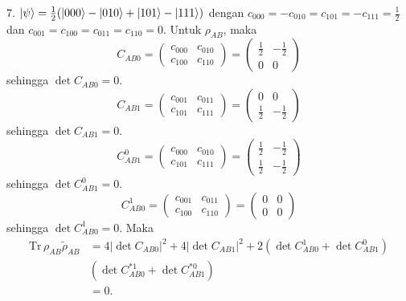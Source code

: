7. { $\ket{\psi}=\frac{1}{2}(\ket{000}-\ket{010}+\ket{101}-\ket{111})$}
dengan $c_{000}=-c_{010}=c_{101}=-c_{111}=\frac{1}{2}$ dan $c_{001}=c_{100}=c_{011}=c_{110}=0$.
Untuk $\rho_{AB}$, maka
\begin{equation}
	C_{AB0}=
	\begin{pmatrix}
		c_{000} & c_{010} \\
		c_{100} & c_{110}
	\end{pmatrix}=
	\begin{pmatrix}
		\frac{1}{2} & -\frac{1}{2} \\
		0 & 0
	\end{pmatrix}
\end{equation}
sehingga $\det C_{AB0} = 0$.
\begin{equation}
	C_{AB1}=
	\begin{pmatrix}
		c_{001} & c_{011} \\
		c_{101} & c_{111}
	\end{pmatrix}=
	\begin{pmatrix}
		0 & 0 \\
		\frac{1}{2} & -\frac{1}{2}
	\end{pmatrix}
\end{equation}
sehingga $\det C_{AB1} = 0$.
\begin{equation}
	C_{AB1}^0=
	\begin{pmatrix}
		c_{000} & c_{010} \\
		c_{101} & c_{111}
	\end{pmatrix}=
	\begin{pmatrix}
		\frac{1}{2} & -\frac{1}{2} \\
		\frac{1}{2} & -\frac{1}{2}
	\end{pmatrix}
\end{equation}
sehingga $\det C_{AB1}^0 = 0$.
\begin{equation}
	C_{AB0}^1=
	\begin{pmatrix}
		c_{001} & c_{011} \\
		c_{100} & c_{110}
	\end{pmatrix}=
	\begin{pmatrix}
		0 & 0 \\
		0 & 0
	\end{pmatrix}
\end{equation}
sehingga $\det C_{AB0}^1 = 0$. Maka
\begin{equation}
	\begin{aligned}
		\mathrm{Tr}\,\rho_{AB}\tilde{\rho}_{AB}
		&=4 |\det C_{AB0}|^2+ 4 |\det C_{AB1}|^2+ 2 (\det C_{AB0}^1 + \det C_{AB1}^0)\\
		&(\det C^{*1}_{AB0} + \det C^{*0}_{AB1})\\
		&=0.
	\end{aligned}
\end{equation}
